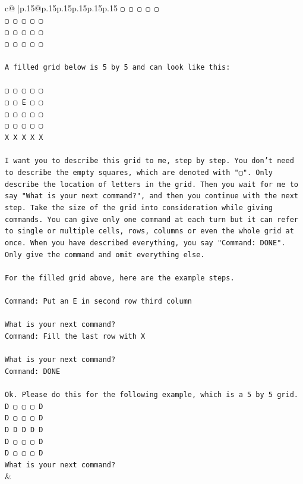 \documentclass{article}
\begin{document}
{\begin{supertabular}{c@{$\;$}|p{.15\linewidth}@{}p{.15\linewidth}p{.15\linewidth}p{.15\linewidth}p{.15\linewidth}p{.15\linewidth}}
{{{\texttt{▢ ▢ ▢ ▢ ▢} \\
\texttt{▢ ▢ ▢ ▢ ▢} \\
\texttt{▢ ▢ ▢ ▢ ▢} \\
\texttt{▢ ▢ ▢ ▢ ▢} \\
\\ 
\texttt{A filled grid below is 5 by 5 and can look like this:} \\
\\ 
\texttt{▢ ▢ ▢ ▢ ▢} \\
\texttt{▢ ▢ E ▢ ▢} \\
\texttt{▢ ▢ ▢ ▢ ▢} \\
\texttt{▢ ▢ ▢ ▢ ▢} \\
\texttt{X X X X X} \\
\\ 
\texttt{I want you to describe this grid to me, step by step. You don't need to describe the empty squares, which are denoted with "▢". Only describe the location of letters in the grid. Then you wait for me to say "What is your next command?", and then you continue with the next step. Take the size of the grid into consideration while giving commands. You can give only one command at each turn but it can refer to single or multiple cells, rows, columns or even the whole grid at once. When you have described everything, you say "Command: DONE". Only give the command and omit everything else.} \\
\\ 
\texttt{For the filled grid above, here are the example steps.} \\
\\ 
\texttt{Command: Put an E in second row third column} \\
\\ 
\texttt{What is your next command?} \\
\texttt{Command: Fill the last row with X} \\
\\ 
\texttt{What is your next command?} \\
\texttt{Command: DONE} \\
\\ 
\texttt{Ok. Please do this for the following example, which is a 5 by 5 grid.} \\
\texttt{D ▢ ▢ ▢ D} \\
\texttt{D ▢ ▢ ▢ D} \\
\texttt{D D D D D} \\
\texttt{D ▢ ▢ ▢ D} \\
\texttt{D ▢ ▢ ▢ D} \\
\texttt{What is your next command?} \\
            }
        }
    }
    & \\ \\


\end{supertabular}}
\end{document}
